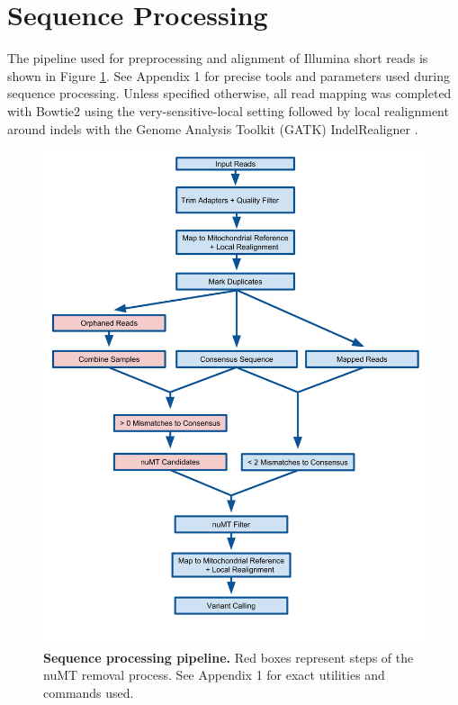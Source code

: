 \documentclass[12pt,twoside]{reedthesis}
\begin{document}

\section{Sequence Processing}
The pipeline used for preprocessing and alignment of Illumina short reads is shown in Figure \ref{pipeline}.
See Appendix 1 for precise tools and parameters used during sequence processing.
Unless specified otherwise, all read mapping was completed with Bowtie2 using the very-sensitive-local setting \citep{langmead_fast_2012} followed by local realignment around indels with the Genome Analysis Toolkit (GATK) IndelRealigner \citep{mckenna_genome_2010}. 

\begin{figure}[p]
        \begin{center}
            \includegraphics[width=1\textwidth]{../figures/pipeline_figure.png}
        \end{center}
        \caption[Sequence processing pipeline]{\textbf{Sequence processing pipeline.} Red boxes represent steps of the nuMT removal process. See Appendix 1 for exact utilities and commands used.}
    \label{pipeline}
\end{figure}
\end{document}
